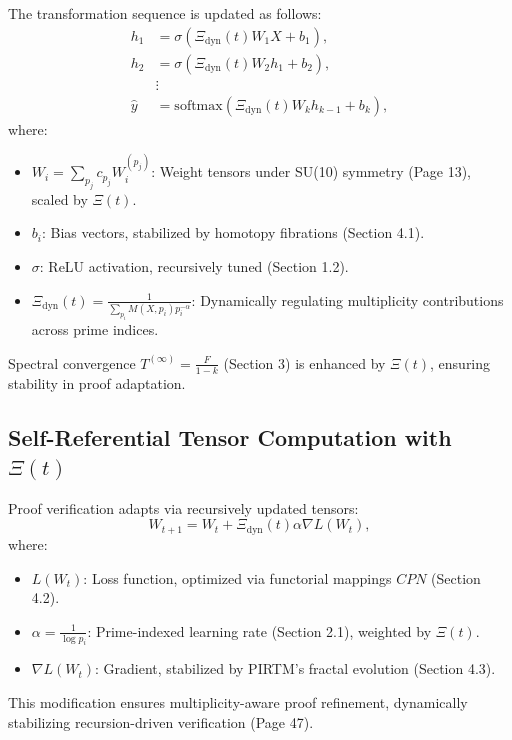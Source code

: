\documentclass{article}
\theoremstyle{plain}
\begin{document}
The transformation sequence is updated as follows:
\begin{align}
h_1 &= \sigma(\Xi_{\text{dyn}}(t) W_1 X + b_1), \\
h_2 &= \sigma(\Xi_{\text{dyn}}(t) W_2 h_1 + b_2), \\
&\vdots \\
\hat{y} &= \text{softmax}(\Xi_{\text{dyn}}(t) W_k h_{k-1} + b_k),
\end{align}
where:
\begin{itemize}
    \item \( W_i = \sum_{p_j} c_{p_j} W_i^{(p_j)} \): Weight tensors under SU(10) symmetry (Page 13), scaled by \(\Xi(t) \).
    \item \( b_i \): Bias vectors, stabilized by homotopy fibrations (Section 4.1).
    \item \( \sigma \): ReLU activation, recursively tuned (Section 1.2).
    \item \( \Xi_{\text{dyn}}(t) = \frac{1}{\sum_{p_i} M(X, p_i) p_i^{-\alpha}} \): Dynamically regulating multiplicity contributions across prime indices.
\end{itemize}
Spectral convergence \( T^{(\infty)} = \frac{F}{1 - k} \) (Section 3) is enhanced by \(\Xi(t) \), ensuring stability in proof adaptation.

\subsection{Self-Referential Tensor Computation with \(\Xi(t) \)}
Proof verification adapts via recursively updated tensors:
\begin{equation}
W_{t+1} = W_t + \Xi_{\text{dyn}}(t) \alpha \nabla L(W_t),
\end{equation}
where:
\begin{itemize}
    \item \( L(W_t) \): Loss function, optimized via functorial mappings \( CPN \) (Section 4.2).
    \item \( \alpha = \frac{1}{\log p_i} \): Prime-indexed learning rate (Section 2.1), weighted by \(\Xi(t) \).
    \item \( \nabla L(W_t) \): Gradient, stabilized by PIRTM’s fractal evolution (Section 4.3).
\end{itemize}
This modification ensures multiplicity-aware proof refinement, dynamically stabilizing recursion-driven verification (Page 47).
\end{document}
